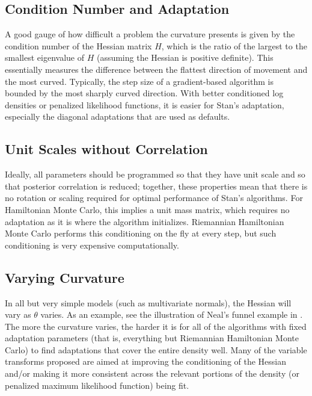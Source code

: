 \subsection{Condition Number and Adaptation}

A good gauge of how difficult a problem the curvature presents is
given by the condition number of the Hessian matrix $H$, which is the
ratio of the largest to the smallest eigenvalue of $H$ (assuming the
Hessian is positive definite).  This essentially measures the
difference between the flattest direction of movement and the most
curved.  Typically, the step size of a gradient-based algorithm is
bounded by the most sharply curved direction.  With better conditioned
log densities or penalized likelihood functions, it is easier for
Stan's adaptation, especially the diagonal adaptations that are used
as defaults.

\subsection{Unit Scales without Correlation}

Ideally, all parameters should be programmed so that they have unit
scale and so that posterior correlation is reduced; together, these
properties mean that there is no rotation or scaling required for
optimal performance of Stan's algorithms.  For Hamiltonian Monte
Carlo, this implies a unit mass matrix, which requires no adaptation
as it is where the algorithm initializes.  Riemannian Hamiltonian
Monte Carlo performs this conditioning on the fly at every step, but
such conditioning is very expensive computationally.

\subsection{Varying Curvature}

In all but very simple models (such as multivariate normals), the
Hessian will vary as $\theta$ varies.  As an example, see the
illustration of Neal's funnel example in .  The more
the curvature varies, the harder it is for all of the algorithms with
fixed adaptation parameters (that is, everything but Riemannian
Hamiltonian Monte Carlo) to find adaptations that cover the entire
density well.  Many of the variable transforms proposed are aimed at
improving the conditioning of the Hessian and/or making it more
consistent across the relevant portions of the density (or penalized
maximum likelihood function) being fit.

